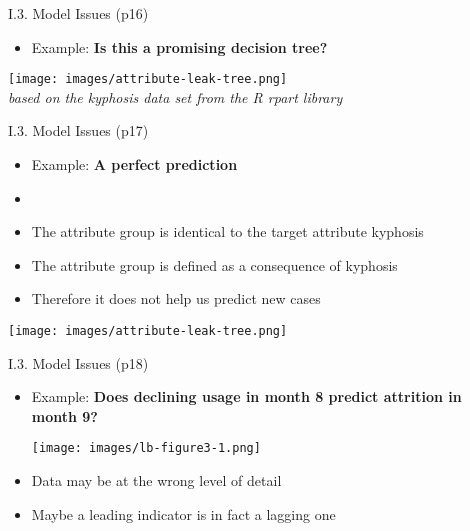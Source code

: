 \documentclass[handout]{beamer}
\newcommand{\strong}[1]{\textbf{\color{teal} #1}}
\begin{document}
\begin{frame}{I.3. Model Issues (p16)}
\begin{itemize}
\item Example: \strong{Is this a promising decision tree?}
\end{itemize}
\begin{center}
\texttt{[image: images/attribute-leak-tree.png]}\\
\emph{based on the kyphosis data set from the R rpart library}
\end{center}
\end{frame}
\begin{frame}{I.3. Model Issues (p17)}
\begin{itemize}
\item[] Example: \strong{A perfect prediction}
\item[]
\item The attribute group is identical to the target attribute kyphosis
\item The attribute group is defined as a consequence of kyphosis
\item Therefore it does not help us predict new cases
\end{itemize}
\begin{center}
\texttt{[image: images/attribute-leak-tree.png]}
\end{center}
\end{frame}
\begin{frame}{I.3. Model Issues (p18)}
\begin{itemize}
\item Example: \strong{Does declining usage in month 8 predict attrition in month 9?}
\begin{center}
\texttt{[image: images/lb-figure3-1.png]}\\
\cite[Figure 3.1]{LB3:2011}
\end{center}
\item Data may be at the wrong level of detail
\item Maybe a leading indicator is in fact a lagging one
\end{itemize}
\end{frame}
\end{document}
